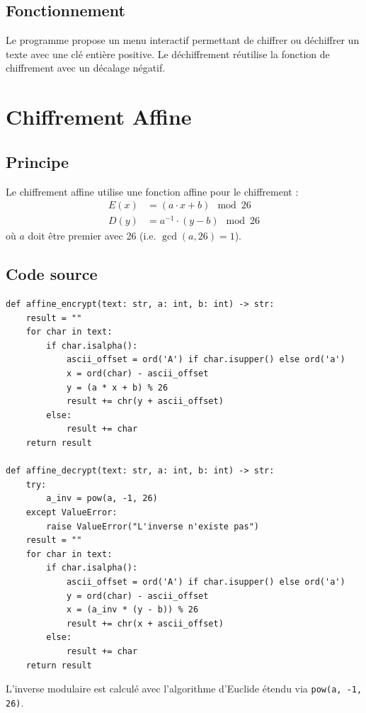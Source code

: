 \documentclass[12pt,a4paper]{report}
\begin{document}
\subsection{Fonctionnement}
Le programme propose un menu interactif permettant de chiffrer ou déchiffrer un texte avec une clé entière positive. Le déchiffrement réutilise la fonction de chiffrement avec un décalage négatif.

\section{Chiffrement Affine}

\subsection{Principe}
Le chiffrement affine utilise une fonction affine pour le chiffrement :
\begin{align}
E(x) &= (a \cdot x + b) \mod 26 \\
D(y) &= a^{-1} \cdot (y - b) \mod 26
\end{align}
où $a$ doit être premier avec 26 (i.e. $\gcd(a, 26) = 1$).

\subsection{Code source}
\begin{lstlisting}[style=python,caption=affine.py - Fonctions principales]
def affine_encrypt(text: str, a: int, b: int) -> str:
    result = ""
    for char in text:
        if char.isalpha():
            ascii_offset = ord('A') if char.isupper() else ord('a')
            x = ord(char) - ascii_offset
            y = (a * x + b) % 26
            result += chr(y + ascii_offset)
        else:
            result += char
    return result

def affine_decrypt(text: str, a: int, b: int) -> str:
    try:
        a_inv = pow(a, -1, 26)
    except ValueError:
        raise ValueError("L'inverse n'existe pas")
    result = ""
    for char in text:
        if char.isalpha():
            ascii_offset = ord('A') if char.isupper() else ord('a')
            y = ord(char) - ascii_offset
            x = (a_inv * (y - b)) % 26
            result += chr(x + ascii_offset)
        else:
            result += char
    return result
\end{lstlisting}

L'inverse modulaire est calculé avec l'algorithme d'Euclide étendu via \texttt{pow(a, -1, 26)}.
\end{document}
